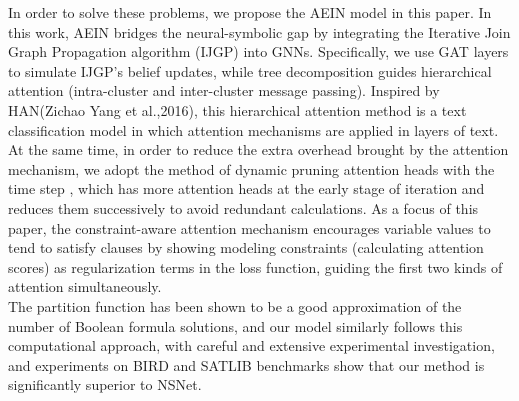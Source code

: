 In order to solve these problems, we propose the AEIN model in this paper. In this work, AEIN bridges the neural-symbolic gap by integrating the 
Iterative Join Graph Propagation  algorithm (IJGP)\cite{A15} into GNNs.   Specifically, we use GAT layers to simulate IJGP's belief updates, while 
tree decomposition guides hierarchical attention (intra-cluster and inter-cluster message passing). Inspired by HAN(Zichao Yang et al.,2016)\cite{B5}, 
this hierarchical attention method is a text classification model in which attention mechanisms are applied in layers of text. At the same time, 
in order to reduce the extra overhead brought by the attention mechanism, we adopt the method of dynamic pruning attention heads with the time step
\cite{B6}\cite{A16}, which has more attention heads at the early stage of iteration and reduces them successively to avoid redundant calculations.
As a focus of this paper, the constraint-aware attention mechanism encourages variable values to tend to satisfy clauses by showing modeling 
constraints (calculating attention scores) as regularization terms in the loss function, guiding the first two kinds of attention simultaneously. \\

The partition function has been shown to be a good approximation of the number of Boolean formula solutions\cite{A17}\cite{A18}, and our model 
similarly follows this computational approach, with careful and extensive experimental investigation, and experiments on BIRD and SATLIB benchmarks 
show that our method is significantly superior to NSNet. 
